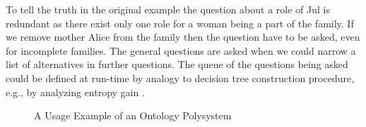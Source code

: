 \documentclass[conference]{IEEEtran}
\begin{document}
To tell the truth in the original example the question about a role of
Jul is redundant as there exist only one role for a woman being a part
of the family.  If we remove mother Alice from the family then the
question have to be asked, even for incomplete families.  The general
questions are asked when we could narrow a list of alternatives in
further questions.  The queue of the questions being asked could be
defined at run-time by analogy to decision tree construction
procedure, e.g., by analyzing entropy gain \cite{dectrees}.

\begin{figure}
\centering\footnotesize\sf
\def\svgwidth{0.9\linewidth}

\caption{A Usage Example of an Ontology Polysystem}
\label{OPSA}
\end{figure}







\end{document}
